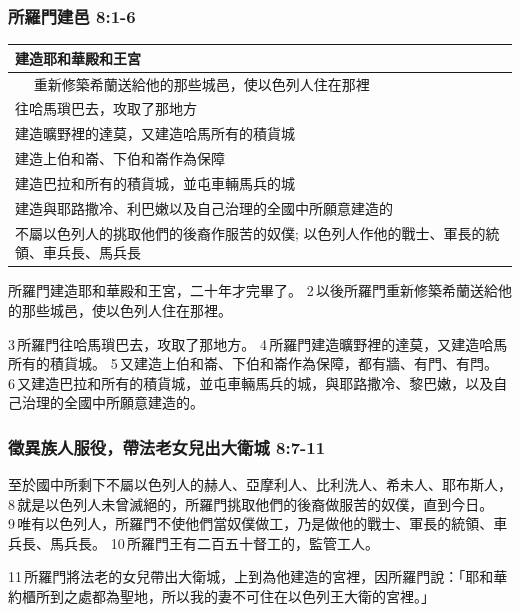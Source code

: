 \subsubsection{所羅門建邑 8:1-6}
\begin{table}[H]
\centering 
\begin{tabular}{ p{14cm} }\hline\hline
建造耶和華殿和王宮\\\hline　
重新修築希蘭送給他的那些城邑，使以色列人住在那裡  \\\hline
往哈馬瑣巴去，攻取了那地方 \\\hline
建造曠野裡的達莫，又建造哈馬所有的積貨城\\\hline
建造上伯和崙、下伯和崙作為保障\\\hline
 建造巴拉和所有的積貨城，並屯車輛馬兵的城\\\hline
 建造與耶路撒冷、利巴嫩以及自己治理的全國中所願意建造的\\\hline
 不屬以色列人的挑取他們的後裔作服苦的奴僕; 以色列人作他的戰士、軍長的統領、車兵長、馬兵長\\\hline
 \end{tabular}
\end{table}
所羅門建造耶和華殿和王宮，二十年才完畢了。 2 以後所羅門重新修築希蘭送給他的那些城邑，使以色列人住在那裡。

3 所羅門往哈馬瑣巴去，攻取了那地方。 4 所羅門建造曠野裡的達莫，又建造哈馬所有的積貨城。 5 又建造上伯和崙、下伯和崙作為保障，都有牆、有門、有閂。 6 又建造巴拉和所有的積貨城，並屯車輛馬兵的城，與耶路撒冷、黎巴嫩，以及自己治理的全國中所願意建造的。

\subsubsection{徵異族人服役，帶法老女兒出大衛城 8:7-11}
至於國中所剩下不屬以色列人的赫人、亞摩利人、比利洗人、希未人、耶布斯人， 8 就是以色列人未曾滅絕的，所羅門挑取他們的後裔做服苦的奴僕，直到今日。 9 唯有以色列人，所羅門不使他們當奴僕做工，乃是做他的戰士、軍長的統領、車兵長、馬兵長。 10 所羅門王有二百五十督工的，監管工人。

11 所羅門將法老的女兒帶出大衛城，上到為他建造的宮裡，因所羅門說：「耶和華約櫃所到之處都為聖地，所以我的妻不可住在以色列王大衛的宮裡。」

